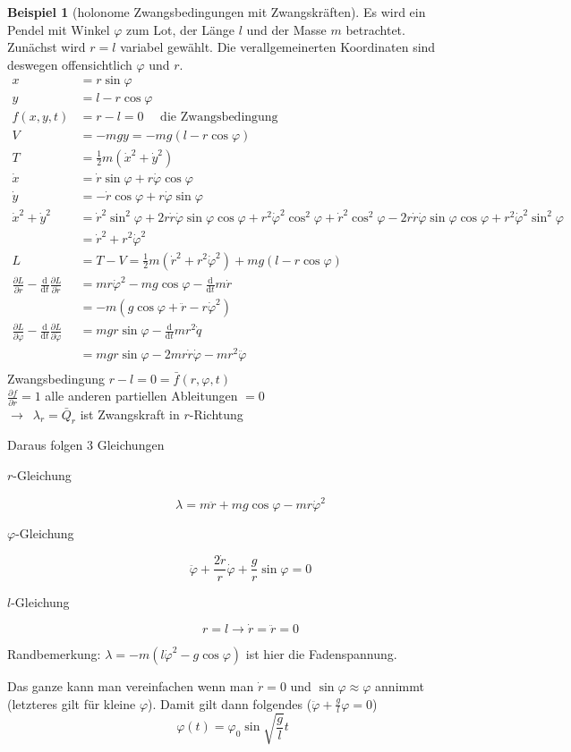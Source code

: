 \documentclass[oneside]{book}
\theoremstyle{definition}
\newtheorem*{beispiel*}{Beispiel}
\newcommand{\conseq}{$\rightarrow$~}
\renewcommand{\d}{\mathrm d}
\newcommand{\dd}[1]{\frac{\d}{\d #1}}
\newcommand{\ffpartial}[2]{\frac{\partial #1}{\partial #2}}
\newcommand{\vp}{\varphi}
\begin{document}
\begin{beispiel*}[holonome Zwangsbedingungen mit Zwangskräften]
Es wird ein Pendel mit Winkel $\varphi$ zum Lot, der Länge $l$ und der Masse $m$ betrachtet.
Zunächst wird $r=l$ variabel gewählt. Die verallgemeinerten Koordinaten sind deswegen offensichtlich $\varphi$ und $r$.
\begin{align*}
x &= r \sin \varphi\\
y &= l - r \cos \varphi\\
f(x,y,t) &= r - l = 0 \text{~~~~die Zwangsbedingung}\\
V &= -mg y = -mg (l -r \cos \varphi)\\
T &= \frac12 m (\dot{x}^2 + \dot{y}^2)\\
\dot{x} &= \dot{r} \sin \varphi + r \dot{\varphi} \cos \varphi\\
\dot{y} &= - \dot{r} \cos \varphi + r \dot{\varphi} \sin \varphi\\
\dot{x}^2 + \dot{y}^2 &= \dot{r}^2 \sin^2 \varphi + 2 r \dot{r} \dot\varphi \sin \varphi \cos \varphi + r^2 \dot{\varphi}^2 \cos^2 \varphi + \dot{r}^2 \cos^2 \varphi - 2 r \dot r \dot \varphi \sin \varphi \cos \varphi + r^2 \dot{\varphi}^2 \sin^2 \varphi \\
&= \dot{r}^2 + r^2 \dot{\varphi}^2\\
L &= T-V = \frac12 m (\dot{r}^2 + r^2 \dot{\varphi}^2) + mg(l - r \cos \varphi)\\
\ffpartial{L}{r} - \dd t \ffpartial{L}{\dot{r}} &= m r \dot{\varphi}^2 - mg \cos \varphi - \dd t m \dot{r} \\
&= -m (g \cos \varphi + \ddot{r} - r \dot{\varphi}^2)\\
\ffpartial{L}{\varphi} - \dd t \ffpartial{L}{\dot{\varphi}} &= mgr \sin \varphi - \dd t m r^2 \dot{q} \\
&= mgr \sin \varphi - 2mr\dot{r}\dot{\varphi} - mr^2 \ddot{\varphi}\\
\end{align*}
Zwangsbedingung $r-l = 0 = \bar{f}(r, \varphi, t)$\\
$\ffpartial{f}{r} = 1$ alle anderen partiellen Ableitungen $= 0$\\
\conseq $\lambda_r = \bar{Q}_r$ ist Zwangskraft in $r$-Richtung

Daraus folgen 3 Gleichungen
\begin{description}
	\item[$r$-Gleichung] $$\lambda = m \ddot{r} + mg \cos \varphi - m r \dot{\varphi}^2$$
	\item[$\varphi$-Gleichung] $$\ddot{\varphi} + \frac{2 \dot{r}}{r} \dot{\varphi} + \frac{g}{r} \sin \varphi = 0$$
	\item[$l$-Gleichung] $$r = l \rightarrow \dot{r} = \ddot{r} = 0 $$
\end{description}
Randbemerkung: $\lambda = -m(l \dot{\varphi}^2 - g \cos \varphi)$ ist hier die Fadenspannung.

Das ganze kann man vereinfachen wenn man $\dot{r} = 0$ und $\sin \varphi \approx \varphi$ annimmt (letzteres gilt für kleine $\varphi$). Damit gilt dann folgendes ($\ddot{\vp} + \frac{g}{l} \vp = 0$)
$$\varphi(t) = \varphi_0 \sin \sqrt{\frac{g}{l}} t$$
\end{beispiel*}
\end{document}
